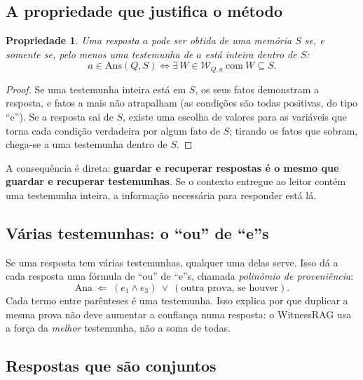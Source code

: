 \documentclass[11pt]{article}
\newtheorem{propriedade}{Propriedade}
\begin{document}
\subsection{A propriedade que justifica o método}

\begin{propriedade}
Uma resposta $a$ pode ser obtida de uma memória $S$ se, e somente se, pelo
menos uma testemunha de $a$ está inteira dentro de $S$:
\[
a\in\mathrm{Ans}(Q,S)\iff\exists\,W\in\mathcal{W}_{Q,a}\ \text{com}\ W\subseteq S.
\]
\end{propriedade}
\begin{proof}
Se uma testemunha inteira está em $S$, os seus fatos demonstram a resposta, e
fatos a mais não atrapalham (as condições são todas positivas, do tipo ``e'').
Se a resposta sai de $S$, existe uma escolha de valores para as variáveis que
torna cada condição verdadeira por algum fato de $S$; tirando os fatos que
sobram, chega-se a uma testemunha dentro de $S$.
\end{proof}

A consequência é direta: \textbf{guardar e recuperar respostas é o mesmo que
guardar e recuperar testemunhas}. Se o contexto entregue ao leitor contém uma
testemunha inteira, a informação necessária para responder está lá.

\subsection{Várias testemunhas: o ``ou'' de ``e''s}

Se uma resposta tem várias testemunhas, qualquer uma delas serve. Isso dá a
cada resposta uma fórmula de ``ou'' de ``e''s, chamada \emph{polinômio de
proveniência}:
\[
\text{Ana}\ \Leftarrow\ (e_1\wedge e_3)\ \vee\ (\text{outra prova, se houver}).
\]
Cada termo entre parênteses é uma testemunha. Isso explica por que duplicar a
mesma prova não deve aumentar a confiança numa resposta: o WitnessRAG usa a
força da \emph{melhor} testemunha, não a soma de todas.

\subsection{Respostas que são conjuntos}
\end{document}
